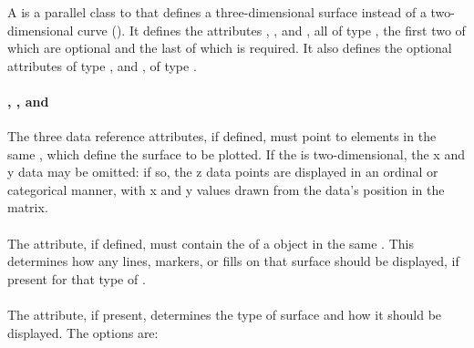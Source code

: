 \subsubsection{}
\label{class:surface}
\begin{blockChanged}
A \Surface is a parallel class to \AbstractCurve that defines a three-dimensional surface instead of a two-dimensional curve ().  It defines the attributes , , and , all of type \SIdRef, the first two of which are optional and the last of which is required.  It also defines the optional attributes  of type \SIdRef, and , of type \SurfaceType.


\paragraph*{, , and }
The three data reference attributes, if defined, must point to \DataGenerator elements in the same \SedDocument, which define the surface to be plotted.  If the  is two-dimensional, the x and y data may be omitted: if so, the z data points are displayed in an ordinal or categorical manner, with x and y values drawn from the data's position in the matrix.

\paragraph*{}
The  attribute, if defined, must contain the  of a \Style object in the same \SedDocument.  This \Style determines how any lines, markers, or fills on that surface should be displayed, if present for that type of \Surface.

\paragraph*{}
The  attribute, if present, determines the type of surface and how it should be displayed.  The options are:


\end{blockChanged}
